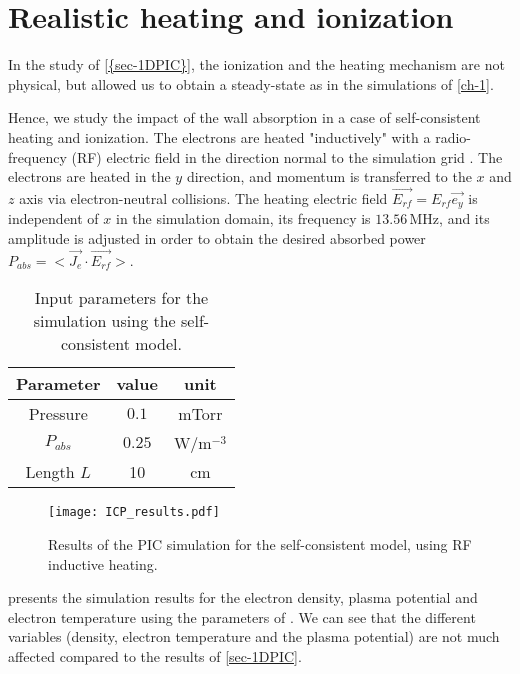 
\section{Realistic heating and ionization}
  \label{sec-realistic_1D}
  In the study of \cref{{sec-1DPIC}}, the ionization and the heating mechanism are not physical, but allowed us to obtain a steady-state as in the simulations of \cref{ch-1}.

  Hence, we study the impact of the wall absorption in a case of self-consistent heating and ionization.
  The electrons are heated "inductively" with a radio-frequency (RF) electric field in the direction normal to the simulation grid \cite{meige2006a, lucken2018, turner1993}.
  The electrons are heated in the $y$ direction, and momentum is transferred to the $x$ and $z$ axis via electron-neutral collisions.
  The heating electric field $\vec{E_{rf}} = E_{rf} \vec{e_y}$ is independent of $x$ in the simulation domain, its frequency is $13.56$\,MHz, and its amplitude is adjusted in order to obtain the desired absorbed power $P_{abs} = < \vec{J_e} \cdot  \vec{E_{rf}}>$.
  


  \begin{table}[!htbp]
    \centering
    \begin{tabular}{@{} c | c | c}
      Parameter & value & unit \\ \hline
      Pressure & $0.1$ & mTorr\\
      $P_{abs}$ & $0.25$ & W/m$^{-3}$\\
      Length $L$&10&cm\\
    \end{tabular}
    \caption{Input parameters for the simulation using the self-consistent model.}
    \label{tab-PIC2}
  \end{table}

  \begin{figure}[!htbp]
    \center
    \texttt{[image: ICP\_results.pdf]}
    \caption{Results of the PIC simulation for the self-consistent model, using RF inductive heating.}
    \label{fig-icpresults}
  \end{figure}

   presents the simulation results for the electron density, plasma potential and electron temperature using the parameters of .
  We can see that the different variables (density, electron temperature and the plasma potential) are not much affected compared to the results of \cref{sec-1DPIC}.

